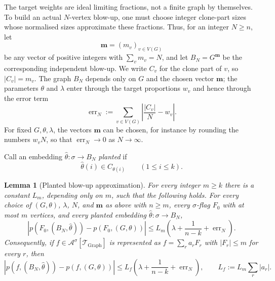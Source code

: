 \documentclass[11pt]{article}
\newtheorem{lemma}[lemma]{Lemma}
\theoremstyle{definition}
\newcommand{\A}{\mathcal{A}}
\newcommand{\T}{\mathcal{T}}
\begin{document}
The target weights are ideal limiting fractions, not a finite graph by
themselves.  To build an actual $N$-vertex blow-up, one must choose integer
clone-part sizes whose normalised sizes approximate these fractions.  Thus, for
an integer $N\ge n$, let
\[
  \mathbf m=(m_v)_{v\in V(G)}
\]
be any vector of positive integers with $\sum_v m_v=N$, and let
$B_N=G^{\mathbf m}$ be the corresponding independent blow-up.  We write $C_v$
for the clone part of $v$, so $|C_v|=m_v$.  The graph $B_N$ depends only on
$G$ and the chosen vector $\mathbf m$; the parameters $\theta$ and $\lambda$
enter through the target proportions $w_v$ and hence through the error term
\[
  \operatorname{err}_N
  :=
  \sum_{v\in V(G)}\left|\frac{|C_v|}{N}-w_v\right|.
\]
For fixed $G,\theta,\lambda$, the vectors $\mathbf m$ can be chosen, for
instance by rounding the numbers $w_vN$, so that
$\operatorname{err}_N\to0$ as $N\to\infty$.

Call an embedding $\widehat\theta:\sigma\to B_N$ \emph{planted} if
\[
  \widehat\theta(i)\in C_{\theta(i)}
  \qquad(1\le i\le k).
\]

\begin{lemma}[Planted blow-up approximation]\label{lem:planted-estimate}
For every integer $m\ge k$ there is a constant $L_m$, depending only on $m$,
such that the following holds.  For every choice of $(G,\theta)$, $\lambda$,
$N$, and $\mathbf m$ as above with $n\ge m$, every $\sigma$-flag $F_0$ with at
most $m$ vertices, and every planted embedding
$\widehat\theta:\sigma\to B_N$,
\begin{equation}\label{eq:planted-estimate}
  \left|p(F_0,(B_N,\widehat\theta))-p(F_0,(G,\theta))\right|
  \le
  L_m\left(\lambda+\frac1{n-k}+\operatorname{err}_N\right).
\end{equation}
Consequently, if $f\in\A^\sigma[\T_{\mathrm{Graph}}]$ is represented as
$f=\sum_r a_rF_r$ with $|F_r|\le m$ for every $r$, then
\[
  \left|p(f,(B_N,\widehat\theta))-p(f,(G,\theta))\right|
  \le
  L_f\left(\lambda+\frac1{n-k}+\operatorname{err}_N\right),
  \qquad
  L_f:=L_m\sum_r|a_r|.
\]
\end{lemma}
\end{document}
